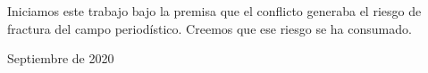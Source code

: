 Iniciamos este trabajo bajo la premisa que el conflicto generaba el riesgo de fractura del campo periodístico. Creemos que ese riesgo se ha consumado.

Septiembre de 2020

%
%
%
%
%
%
%
%
%
%
%
%
